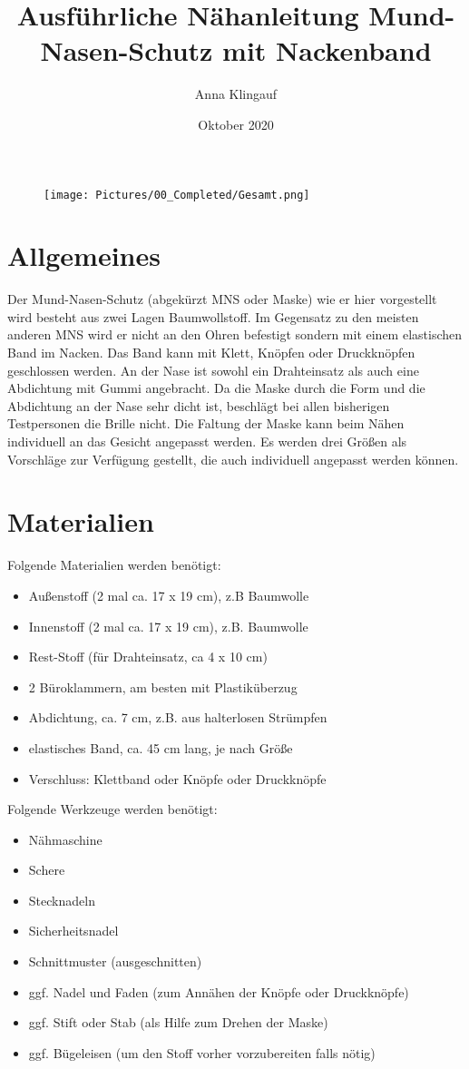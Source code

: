\documentclass[12pt,parskip=full]{scrartcl}
\title{Ausführliche Nähanleitung Mund-Nasen-Schutz mit Nackenband}
\author{Anna Klingauf}
\date{Oktober 2020}
\begin{document}
\begin{titlepage}
\maketitle
\thispagestyle{empty}
\begin{figure}[b!] 
  \centering
     \texttt{[image: Pictures/00\_Completed/Gesamt.png]}
\end{figure}
\end{titlepage}
\clearpage

\section{Allgemeines}
Der Mund-Nasen-Schutz (abgekürzt MNS oder Maske) wie er hier vorgestellt wird besteht aus zwei Lagen Baumwollstoff. Im Gegensatz zu den meisten anderen MNS wird er nicht an den Ohren befestigt sondern mit einem elastischen Band im Nacken. Das Band kann mit Klett, Knöpfen oder Druckknöpfen geschlossen werden. An der Nase ist sowohl ein Drahteinsatz als auch eine Abdichtung mit Gummi angebracht. Da die Maske durch die Form und die Abdichtung an der Nase sehr dicht ist, beschlägt bei allen bisherigen Testpersonen die Brille nicht. Die Faltung der Maske kann beim Nähen individuell an das Gesicht angepasst werden. Es werden drei Größen als Vorschläge zur Verfügung gestellt, die auch individuell angepasst werden können.

\section{Materialien}
Folgende Materialien werden benötigt:
\begin{itemize}
    \item Außenstoff (2 mal ca. 17 x 19 cm), z.B Baumwolle
    \item Innenstoff (2 mal ca. 17 x 19 cm), z.B. Baumwolle
    \item Rest-Stoff (für Drahteinsatz, ca 4 x 10 cm)
    \item 2 Büroklammern, am besten mit Plastiküberzug
    \item Abdichtung, ca. 7 cm, z.B. aus halterlosen Strümpfen
    \item elastisches Band, ca. 45 cm lang, je nach Größe
    \item Verschluss: Klettband oder Knöpfe oder Druckknöpfe
\end{itemize}

Folgende Werkzeuge werden benötigt:
\begin{itemize}
    \item Nähmaschine
    \item Schere
    \item Stecknadeln
    \item Sicherheitsnadel
    \item Schnittmuster (ausgeschnitten)
    \item ggf. Nadel und Faden (zum Annähen der Knöpfe oder Druckknöpfe)
    \item ggf. Stift oder Stab (als Hilfe zum Drehen der Maske)
    \item ggf. Bügeleisen (um den Stoff vorher vorzubereiten falls nötig)
\end{itemize}
\end{document}
